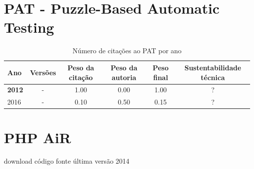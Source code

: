 \section{PAT - Puzzle-Based Automatic Testing}



\begin{table}[H]
\caption{Número de citações ao PAT  por ano}
\centering
\begin{tabular}{| l | c | c | c | c | c |}
  \hline
  Ano & Versões & Peso da citação & Peso da autoria & Peso final & Sustentabilidade técnica \\
  \hline
            {\bf 2012}
          &
          -
          &
          1.00
          &
          0.00
          &
            {\color{blue} 1.00}
          &
          ?
          \\
\hline
            2016
          &
          -
          &
          0.10
          &
          0.50
          &
            {\color{red} 0.15}
          &
          ?
          \\
\hline
\end{tabular}
\end{table}



\section{PHP AiR}
\checkmark download
\checkmark código fonte
\checkmark última versão 2014



